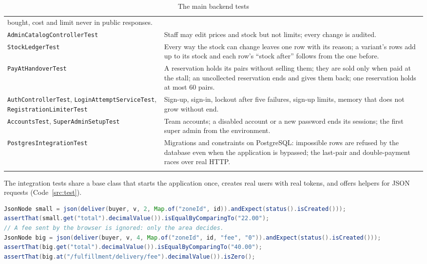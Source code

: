 \begin{longtable}{p{5.3cm} p{8.7cm}}
	bought, cost and limit never in public responses. \\
	\texttt{AdminCatalogControllerTest} & Staff may edit prices and stock but not limits; every change is audited. \\
	\texttt{StockLedgerTest} & Every way the stock can change leaves one row with its reason; a variant's rows add up to
	its stock and each row's ``stock after'' follows from the one before. \\
	\texttt{PayAtHandoverTest} & A reservation holds its pairs without selling them; they are sold only when paid at the
	stall; an uncollected reservation ends and gives them back; one reservation holds at most 60 pairs. \\
	\texttt{AuthControllerTest}, \texttt{LoginAttemptServiceTest}, \texttt{RegistrationLimiterTest} & Sign-up, sign-in,
	lockout after five failures, sign-up limits, memory that does not grow without end. \\
	\texttt{AccountsTest}, \texttt{SuperAdminSetupTest} & Team accounts; a disabled account or a new password ends its
	sessions; the first super admin from the environment. \\
	\texttt{PostgresIntegrationTest} & Migrations and constraints on PostgreSQL: impossible rows are refused by the
	database even when the application is bypassed; the last-pair and double-payment races over real HTTP. \\
	\bottomrule
	\caption{The main backend tests}
	\label{tab:backend-tests}
\end{longtable}
\endgroup

The integration tests share a base class that starts the application once, creates real users with real tokens, and
offers helpers for JSON requests (Code~\ref{src:test}).

\begin{lstlisting}[language=Java, caption={An integration test: a fee sent by the browser is ignored}, label=src:test]
JsonNode small = json(deliver(buyer, v, 2, Map.of("zoneId", id)).andExpect(status().isCreated()));
assertThat(small.get("total").decimalValue()).isEqualByComparingTo("22.00");
// A fee sent by the browser is ignored: only the area decides.
JsonNode big = json(deliver(buyer, v, 4, Map.of("zoneId", id, "fee", "0")).andExpect(status().isCreated()));
assertThat(big.get("total").decimalValue()).isEqualByComparingTo("40.00");
assertThat(big.at("/fulfillment/delivery/fee").decimalValue()).isZero();
\end{lstlisting}

